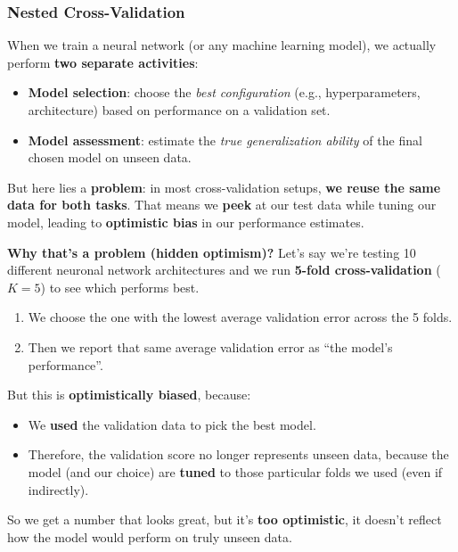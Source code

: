 \subsubsection{Nested Cross-Validation}

When we train a neural network (or any machine learning model), we actually perform \textbf{two separate activities}:
\begin{itemize}
    \item \textbf{Model selection}: choose the \emph{best configuration} (e.g., hyperparameters, architecture) based on performance on a validation set.
    \item \textbf{Model assessment}: estimate the \emph{true generalization ability} of the final chosen model on unseen data.
\end{itemize}
\textcolor{Red2}{} But here lies a \textbf{problem}: in most cross-validation setups, \textbf{we reuse the same data for both tasks}. That means we \textbf{peek} at our test data while tuning our model, leading to \textbf{optimistic bias} in our performance estimates.

\highspace
\textcolor{Red2}{ \textbf{Why that's a problem (hidden optimism)?}} Let's say we're testing 10 different neuronal network architectures and we run \textbf{5-fold cross-validation} ($K=5$) to see which performs best.
\begin{enumerate}
    \item We choose the one with the lowest average validation error across the 5 folds.
    \item Then we report that same average validation error as ``the model's performance''.
\end{enumerate}
\textcolor{Red2}{} But this is \textbf{optimistically biased}, because:
\begin{itemize}
    \item We \textbf{used} the validation data to pick the best model.
    \item Therefore, the validation score no longer represents unseen data, because the model (and our choice) are \textbf{tuned} to those particular folds we used (even if indirectly).
\end{itemize}
So we get a number that looks great, but it's \textbf{too optimistic}, it doesn't reflect how the model would perform on truly unseen data.

